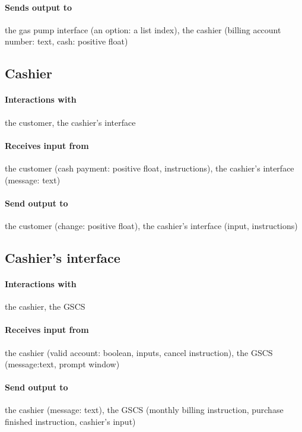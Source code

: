 \paragraph{Sends output to} the gas pump interface (an option: a list index),
the cashier (billing account number: text, cash: positive float)

\subsection{Cashier}

\paragraph{Interactions with} the customer, the cashier's interface

\paragraph{Receives input from} the customer (cash payment: positive float,
instructions), the cashier's interface (message: text)

\paragraph{Send output to} the customer (change: positive float), the cashier's
interface (input, instructions)

\subsection{Cashier's interface}

\paragraph{Interactions with} the cashier, the GSCS

\paragraph{Receives input from} the cashier (valid account: boolean, inputs,
cancel instruction), the GSCS (message:text, prompt window)

\paragraph{Send output to} the cashier (message: text), the GSCS (monthly
billing instruction, purchase finished instruction, cashier's input)

